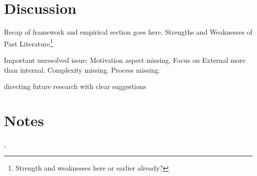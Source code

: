\documentclass[nobib]{tufte-handout}
\begin{document}
\section{Discussion}

 Recap of framework and empirical section goes here. Strengths and Weaknesses of Past Literature\footnote{Strength and weaknesses here or earlier already?}

 Important unresolved issue: Motivation aspect missing. Focus on External more than internal. Complexity missing. Process missing. 

 directing future research with clear suggestions

\section{Notes}
 \citet{Dirth2018}
 \citet{Yoon2011}, \citet{Siatkowski2007}

\newpage
\printbibliography
\end{document}
